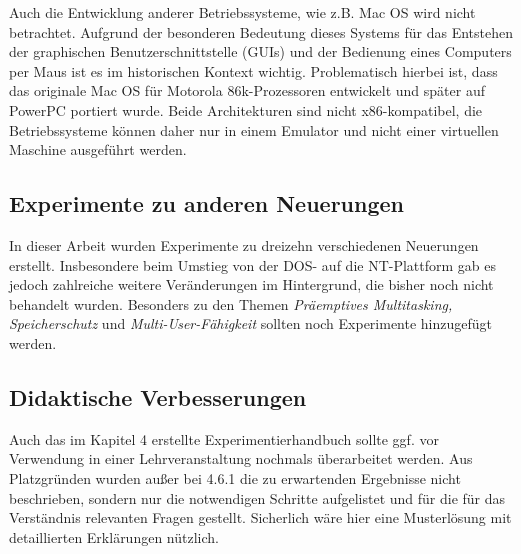		Auch die Entwicklung anderer Betriebssysteme, wie z.B. Mac OS wird nicht betrachtet.
		Aufgrund der besonderen Bedeutung dieses Systems für das Entstehen der graphischen Benutzerschnittstelle (GUIs) und der Bedienung eines Computers per Maus ist es im historischen Kontext wichtig. 
		Problematisch hierbei ist, dass das originale Mac OS für Motorola 86k-Prozessoren entwickelt und später auf PowerPC portiert wurde.
		Beide Architekturen sind nicht x86-kompatibel, die Betriebssysteme können daher nur in einem Emulator und nicht einer virtuellen Maschine ausgeführt werden.

		\subsection{Experimente zu anderen Neuerungen}

		In dieser Arbeit wurden Experimente zu dreizehn verschiedenen Neuerungen erstellt.
		Insbesondere beim Umstieg von der DOS- auf die NT-Plattform gab es jedoch zahlreiche weitere Veränderungen im Hintergrund, die bisher noch nicht behandelt wurden. 
		Besonders zu den Themen \emph{Präemptives Multitasking, Speicherschutz} und \emph{Multi-User-Fähigkeit} sollten noch Experimente hinzugefügt werden.

		\subsection{Didaktische Verbesserungen}

		Auch das im Kapitel 4 erstellte Experimentierhandbuch sollte ggf. vor Verwendung in einer Lehrveranstaltung nochmals überarbeitet werden. 
		Aus Platzgründen wurden außer bei 4.6.1 die zu erwartenden Ergebnisse nicht beschrieben, sondern nur die notwendigen Schritte aufgelistet und für die für das Verständnis relevanten Fragen gestellt.
		Sicherlich wäre hier eine Musterlösung mit detaillierten Erklärungen nützlich.

	